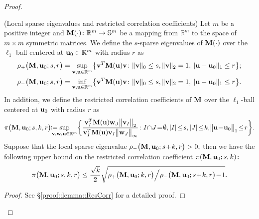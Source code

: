 \documentclass[twoside,11pt]{article}
\newcommand{\defeq}{\vcentcolon=}
\newcommand*{\BR}{\mathbb{R}}
\begin{document}
\begin{proof}
\begin{lemma}\label{lemma::ResCorr}(Local sparse eigenvalues and restricted correlation coefficients)
Let $m$ be a positive integer and  $\Mb(\cdot)\colon \BR^{m} \rightarrow \mathbb{S}^{m}$ be a mapping from $\BR^{m}$ to the space of $m\times m$  symmetric matrices.  We define the $s$-sparse eigenvalues  of $\mathbf{M}(\cdot)$ over the $\ell_1$-ball centered at $\ub_0\in \BR^m$ with radius $r$ as
\begin{align*}
\rho_{+}\bigl(\Mb,\ub_0;s, r \bigr) &=\sup\limits_{\vb,  \ub\in \BR^m} \bigl\{\vb^T \Mb( \ub)\vb \colon \| \vb\|_ 0 \leq s, \|\vb \|_2 = 1,  \|  \ub - \ub_0 \|_1\leq r  \bigr\};\\
\rho_{-}\bigl(\Mb,\ub_0;s,r \bigr)& = \inf\limits_{\vb,\ub\in \BR^m}\bigl\{\vb^T \Mb( \ub)\vb\colon \| \vb\|_ 0 \leq s, \|\vb \|_2 = 1,  \| \ub - \ub_0 \|_1\leq r  \bigr\}.
\end{align*}
In addition,  we define the restricted correlation coefficients of $\mathbf{M}$ over  the $\ell_1$-ball centered at $\mathbf{u}_0$ with radius $r$ as 
\begin{align*}
\pi\bigl(\Mb , \ub_0; s,k,r\bigr )\! \!\defeq\!\!\!\!\! \!\!\sup_{\vb, \wb,\ub\in \BR^m}\biggl\{ \frac{\vb _{I}^T \Mb(\ub)\wb_{J} \big\|\vb_I\big\|_2}{\vb_{I} ^T \Mb(\ub) \vb_{I}\big\|\wb_{J}\big\|_{\infty}}\colon I \!\cap\! J \!=\! \emptyset , |I|\! \leq\! s ,|J|\!\leq\! k,\! \bigl\| \ub \!-\! \ub_0\bigr\|_1 \!\leq\! r\biggr\}.
\end{align*}
Suppose that the local sparse eigenvalue $\rho_{-}\bigl ( \mathbf{M}, \mathbf{u}_0; s\!+\!k,r\bigr) >0,$ then we have  the following upper  bound on the restricted correlation coefficient $\pi(\mathbf{M} , \mathbf{u}_0; s,k ) \colon$
\begin{align*}%
\pi\bigl(\Mb , \ub_0; s,k,r\bigr) \leq \frac{\sqrt{k}}{2} \sqrt{ \rho_{+}\bigl(\Mb , \ub_0;k, r\bigr)\Big /  \rho_{- }\bigl(\Mb , \ub_0;s\!+\!k, r\bigr)\! -\!1 }.
\end{align*}
\end{lemma}
\begin{proof} 
See \S \ref{proof::lemma::ResCorr} for a detailed proof.
\end{proof}


\end{proof}
\end{document}
